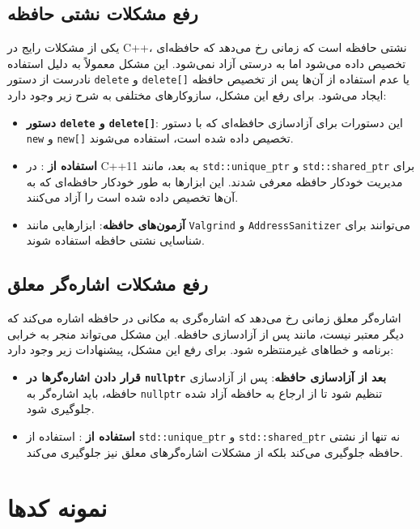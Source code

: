\documentclass[12pt, a4paper]{report}
\begin{document}
\subsection{رفع مشکلات نشتی حافظه}
یکی از مشکلات رایج در C++، نشتی حافظه است که زمانی رخ می‌دهد که حافظه‌ای تخصیص داده می‌شود اما به درستی آزاد نمی‌شود. این مشکل معمولاً به دلیل استفاده نادرست از دستور \texttt{delete} و \texttt{delete[]} یا عدم استفاده از آن‌ها پس از تخصیص حافظه ایجاد می‌شود. برای رفع این مشکل، سازوکارهای مختلفی به شرح زیر وجود دارد:

\begin{itemize}
	\item \textbf{دستور \texttt{delete} و \texttt{delete[]}}: این دستورات برای آزادسازی حافظه‌ای که با دستور \texttt{new} و \texttt{new[]} تخصیص داده شده است، استفاده می‌شوند.
	\item \textbf{استفاده از }: در C++11 به بعد، \texttt{} مانند \texttt{std::unique\_ptr} و \texttt{std::shared\_ptr} برای مدیریت خودکار حافظه معرفی شدند. این ابزارها به طور خودکار حافظه‌ای که به آن‌ها تخصیص داده شده است را آزاد می‌کنند.
	\item \textbf{آزمون‌های حافظه}: ابزارهایی مانند \texttt{Valgrind} و \texttt{AddressSanitizer} می‌توانند برای شناسایی نشتی حافظه استفاده شوند.
\end{itemize}

\subsection{رفع مشکلات اشاره‌گر معلق}
اشاره‌گر معلق زمانی رخ می‌دهد که اشاره‌گری به مکانی در حافظه اشاره می‌کند که دیگر معتبر نیست، مانند پس از آزادسازی حافظه. این مشکل می‌تواند منجر به خرابی برنامه و خطاهای غیرمنتظره شود. برای رفع این مشکل، پیشنهادات زیر وجود دارد:

\begin{itemize}
	\item \textbf{قرار دادن اشاره‌گرها در \texttt{nullptr} بعد از آزادسازی حافظه}: پس از آزادسازی حافظه، باید اشاره‌گر به \texttt{nullptr} تنظیم شود تا از ارجاع به حافظه آزاد شده جلوگیری شود.
	\item \textbf{استفاده از }: استفاده از \texttt{std::unique\_ptr} و \texttt{std::shared\_ptr} نه تنها از نشتی حافظه جلوگیری می‌کند بلکه از مشکلات اشاره‌گرهای معلق نیز جلوگیری می‌کند.
\end{itemize}

\section{نمونه کدها}
\end{document}
